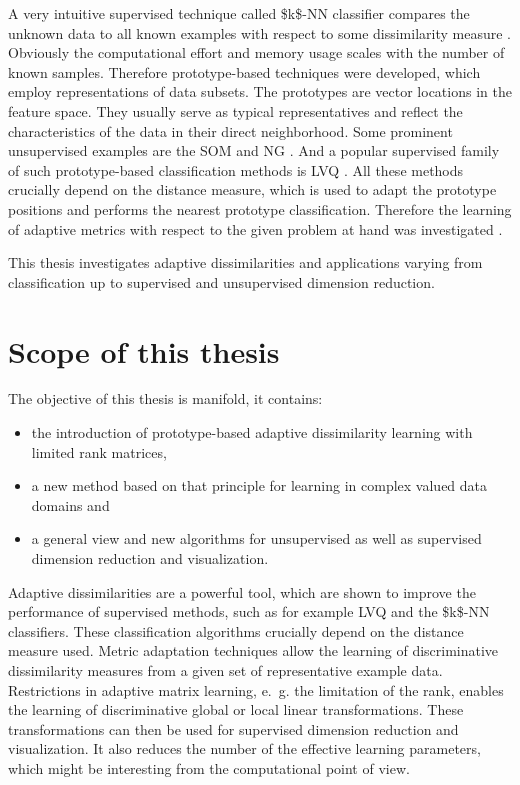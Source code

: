 A very intuitive supervised technique called \ac{$k$-NN} classifier compares the unknown data to all known examples with 
respect to some dissimilarity measure \cite{Duda2000}. 
Obviously the computational effort and memory usage scales with the number of known samples. 
Therefore prototype-based techniques were developed, which employ representations of data subsets. 
The prototypes are vector locations in the feature space. 
They usually serve as typical representatives and reflect the characteristics of the data in their direct neighborhood. 
Some prominent unsupervised examples are the \ac{SOM} \cite{Kohonen2001} and \ac{NG} \cite{Martinetz1991}. 
And a popular supervised family of such prototype-based classification methods is \ac{LVQ} \cite{Kohonen2001}. 
All these methods crucially depend on the distance measure, which is used to adapt the prototype positions and 
performs the nearest prototype classification. 
Therefore the learning of adaptive metrics with respect to the given problem at hand was investigated \cite{Xing2002,Chopra2005,Frome2007,Schneider2009a,Schneider2009b}. 

This thesis investigates adaptive dissimilarities and applications varying from classification up to supervised and unsupervised 
dimension reduction. 

\section{Scope of this thesis}

The objective of this thesis is manifold, it contains:
\begin{itemize}
\item the introduction of prototype-based adaptive dissimilarity learning with limited rank matrices, 
\item a new method based on that principle for learning in complex valued data domains and 
\item a general view and new algorithms for unsupervised as well as supervised dimension reduction and visualization. 
\end{itemize}
Adaptive dissimilarities are a powerful tool, which are shown to improve the performance of supervised methods, such as 
for example \ac{LVQ} and the \ac{$k$-NN} classifiers. 
These classification algorithms crucially depend on the distance measure used. 
Metric adaptation techniques allow the learning of discriminative dissimilarity measures from a given set of representative example data. 
Restrictions in adaptive matrix learning, e.\ g. the limitation of the rank, enables  
the learning of discriminative global or local linear transformations. 
These transformations can then be used for supervised dimension reduction and visualization. 
It also reduces the number of the effective learning parameters, 
which might be interesting from the computational point of view. 

